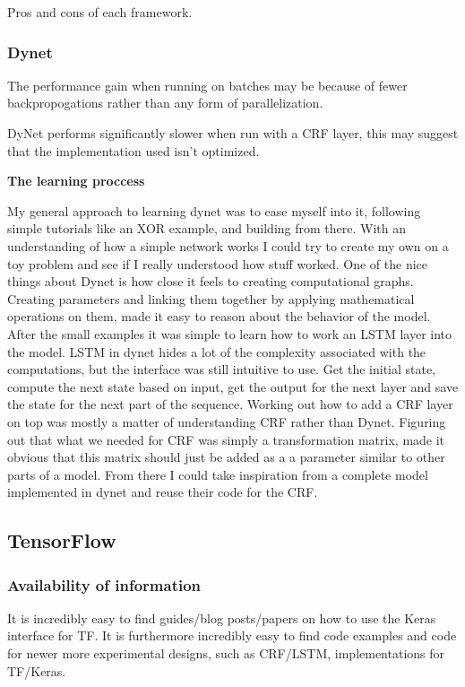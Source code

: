 Pros and cons of each framework.

\subsubsection{Dynet}

The performance gain when running on batches may be because of fewer
backpropogations rather than any form of parallelization.

DyNet performs significantly slower when run with a CRF layer, this may suggest
that the implementation used isn't optimized. 



\textbf{The learning proccess}

My general approach to learning dynet was to ease myself into it, following
simple tutorials like an XOR example, and building from there. With an
understanding of how a simple network works I could try to create my own on a
toy problem and see if I really understood how stuff worked. One of the nice
things about Dynet is how close it feels to creating computational graphs.
Creating parameters and linking them together by applying mathematical
operations on them, made it easy to reason about the behavior of the model.
After the small examples it was simple to learn how to work an LSTM layer into
the model. LSTM in dynet hides a lot of the complexity associated with the
computations, but the interface was still intuitive to use. Get the initial
state, compute the next state based on input, get the output for the next layer
and save the state for the next part of the sequence. Working out how to add a
CRF layer on top was mostly a matter of understanding CRF rather than Dynet.
Figuring out that what we needed for CRF was simply a transformation matrix,
made it obvious that this matrix should just be added as a a parameter similar
to other parts of a model. From there I could take inspiration from a complete
model implemented in dynet and reuse their code for the CRF.


\subsection{TensorFlow}

\subsubsection{Availability of information}

It is incredibly easy to find guides/blog posts/papers on how to use the Keras
interface for TF. It is furthermore incredibly easy to find code examples and
code for newer more experimental designs, such as CRF/LSTM, implementations for TF/Keras.

